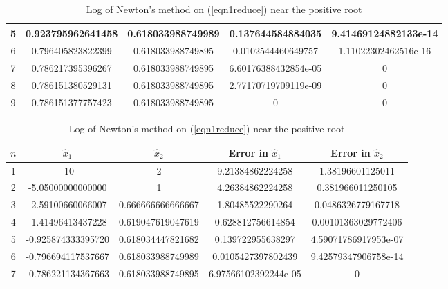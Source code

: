 \begin{table}[H]
\begin{table}[H]
\begin{table}[H]
\begin{table}[htbp]
\begin{subtable}[t]{\textwidth}
\begin{tabular}{|c|c|c|c|c|}
		5	&	\footnotesize	0.923795962641458	&	\footnotesize	0.618033988749989	&	\footnotesize	0.137644584884035		&	\footnotesize	9.41469124882133e-14	\\	\hline
		6	&	\footnotesize	0.796405823822399	&	\footnotesize	0.618033988749895	&	\footnotesize	0.0102544460649757		&	\footnotesize	1.11022302462516e-16	\\	\hline
		7	&	\footnotesize	0.786217395396267	&	\footnotesize	0.618033988749895	&	\footnotesize	6.60176388432854e-05	&	\footnotesize	0						\\	\hline
		8	&	\footnotesize	0.786151380529131	&	\footnotesize	0.618033988749895	&	\footnotesize	2.77170719709119e-09	&	\footnotesize	0						\\	\hline
		9	&	\footnotesize	0.786151377757423	&	\footnotesize	0.618033988749895	&	\footnotesize	0						&	\footnotesize	0						\\	\hline
		\end{tabular}
	\caption{Log of Newton's method on (\ref{eqn1reduce}) near the positive root}
	\label{logeqn1nt+}
	\end{subtable}	
	\begin{subtable}[t]{\textwidth}
		\centering
		\begin{tabular}{|c|c|c|c|c|}
		\hline
		\(n\)	&	\(\hat{x}_1\)	&	\(\hat{x}_2\)	&	Error in \(\hat{x}_1\)	&	Error in \(\hat{x}_2\)		\\	\hline
		1	&	\footnotesize	-10					&	\footnotesize	2					&	\footnotesize	9.21384862224258		&	\footnotesize	1.38196601125011		\\	\hline
		2	&	\footnotesize	-5.05000000000000	&	\footnotesize	1					&	\footnotesize	4.26384862224258		&	\footnotesize	0.381966011250105		\\	\hline
		3	&	\footnotesize	-2.59100660066007	&	\footnotesize	0.666666666666667	&	\footnotesize	1.80485522290264		&	\footnotesize	0.0486326779167718		\\	\hline
		4	&	\footnotesize	-1.41496413437228	&	\footnotesize	0.619047619047619	&	\footnotesize	0.628812756614854		&	\footnotesize	0.00101363029772406		\\	\hline
		5	&	\footnotesize	-0.925874333395720	&	\footnotesize	0.618034447821682	&	\footnotesize	0.139722955638297		&	\footnotesize	4.59071786917953e-07	\\	\hline
		6	&	\footnotesize	-0.796694117537667	&	\footnotesize	0.618033988749989	&	\footnotesize	0.0105427397802439		&	\footnotesize	9.42579347906758e-14	\\	\hline
		7	&	\footnotesize	-0.786221134367663	&	\footnotesize	0.618033988749895	&	\footnotesize	6.97566102392244e-05	&	\footnotesize	0						\\	\hline

\end{tabular}
\end{subtable}
\end{table}
\end{table}
\end{table}
\end{table}
